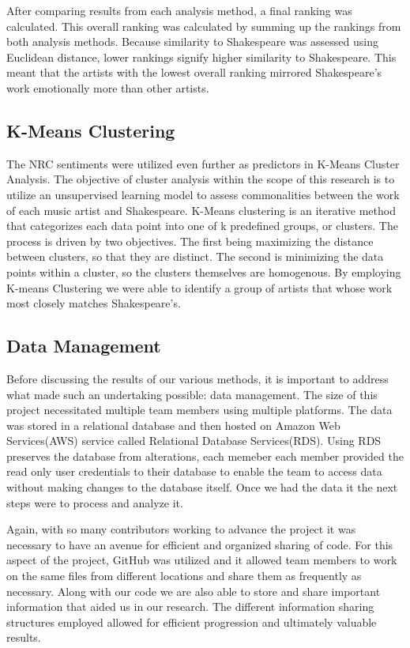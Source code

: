 \documentclass[11pt]{article}
\begin{document}
\noindent After comparing results from each analysis method, a final ranking was calculated. This overall ranking was calculated by summing up the rankings from both analysis methods. Because similarity to Shakespeare was assessed using Euclidean distance, lower rankings signify higher similarity to Shakespeare. This meant that the artists with the lowest overall ranking mirrored Shakespeare’s work emotionally more than other artists.

\subsection{K-Means Clustering}
The NRC sentiments were utilized even further as predictors in K-Means Cluster Analysis. The objective of cluster analysis within the scope of this research is to utilize an unsupervised learning model \cite{k-means} to assess commonalities between the work of each music artist and Shakespeare. K-Means clustering is an iterative method that categorizes each data point into one of k predefined groups, or clusters. The process is driven by two objectives. The first being maximizing the distance between clusters, so that they are distinct. The second is minimizing the data points within a cluster, so the clusters themselves are homogenous. \cite{k-means} By employing K-means Clustering we were able to identify a group of artists that whose work most closely matches Shakespeare’s. 

\subsection{Data Management}
Before discussing the results of our various methods, it is important to address what made such an undertaking possible: data management.  The size of this project necessitated multiple team members using multiple platforms. The data was stored in a relational database and then hosted on  Amazon Web Services(AWS) service called Relational Database Services(RDS). Using RDS preserves the database from alterations, each memeber each member provided the read only user credentials to their database to enable the team to access data without making changes to the database itself. Once we had the data it the next steps were to process and analyze it. 

\noindent Again, with so many contributors working to advance the project it was necessary to have an avenue for efficient and organized sharing of code. For this aspect of the project, GitHub was utilized and it allowed team members to work on the same files from different locations and share them as frequently as necessary. Along with our code we are also able to store and share important information that aided us in our research. The different information sharing structures employed allowed for efficient progression and ultimately valuable results. 
\end{document}
